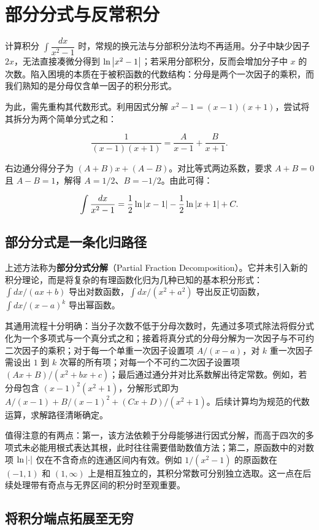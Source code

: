 \section{部分分式与反常积分}
\label{sec:02-Calculus/04-Integration/04}

计算积分 \(\int\dfrac{dx}{x^2-1}\) 时，常规的换元法与分部积分法均不再适用。分子中缺少因子 \(2x\)，无法直接凑微分得到 \(\ln\left|x^2-1\right|\)；若采用分部积分，反而会增加分子中 \(x\) 的次数。陷入困境的本质在于被积函数的代数结构：分母是两个一次因子的乘积，而我们熟知的是分母仅含单一因子的积分形式。

为此，需先重构其代数形式。利用因式分解 \(x^2-1=(x-1)(x+1)\)，尝试将其拆分为两个简单分式之和：

\[
\frac{1}{(x-1)(x+1)}=\frac{A}{x-1}+\frac{B}{x+1}.
\]

右边通分得分子为 \((A+B)x+(A-B)\)。对比等式两边系数，要求 \(A+B=0\) 且 \(A-B=1\)，解得 \(A=1/2\)、\(B=-1/2\)。由此可得：

\[
\int\frac{dx}{x^2-1}=\frac12\ln\left|x-1\right|-\frac12\ln\left|x+1\right|+C .
\]

\subsection{部分分式是一条化归路径}

上述方法称为\textbf{部分分式分解}（Partial Fraction Decomposition）。它并未引入新的积分理论，而是将复杂的有理函数化归为几种已知的基本积分形式：\(\int dx/(ax+b)\) 导出对数函数，\(\int dx/(x^2+a^2)\) 导出反正切函数，\(\int dx/(x-a)^k\) 导出幂函数。

其通用流程十分明确：当分子次数不低于分母次数时，先通过多项式除法将假分式化为一个多项式与一个真分式之和；接着将真分式的分母分解为一次因子与不可约二次因子的乘积；对于每一个单重一次因子设置项 \(A/(x-a)\)，对 \(k\) 重一次因子需设出 \(1\) 到 \(k\) 次幂的所有项；对每一个不可约二次因子设置项 \((Ax+B)/(x^2+bx+c)\)；最后通过通分并对比系数解出待定常数。例如，若分母包含 \((x-1)^2(x^2+1)\)，分解形式即为 \(A/(x-1)+B/(x-1)^2+(Cx+D)/(x^2+1)\)。后续计算均为规范的代数运算，求解路径清晰确定。

值得注意的有两点：第一，该方法依赖于分母能够进行因式分解，而高于四次的多项式未必能用根式表达其根，此时往往需要借助数值方法；第二，原函数中的对数项 \(\ln\left|\cdot\right|\) 仅在不含奇点的连通区间内有效。例如 \(1/(x^2-1)\) 的原函数在 \((-1,1)\) 和 \((1,\infty)\) 上是相互独立的，其积分常数可分别独立选取。这一点在后续处理带有奇点与无界区间的积分时至观重要。

\subsection{将积分端点拓展至无穷}

